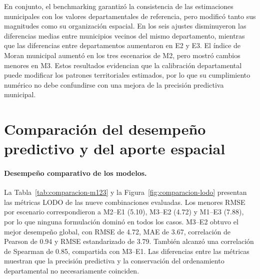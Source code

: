 En conjunto, el benchmarking garantizó la consistencia de las estimaciones municipales con los valores departamentales de referencia, pero modificó tanto sus magnitudes como su organización espacial. En los seis ajustes disminuyeron las diferencias medias entre municipios vecinos del mismo departamento, mientras que las diferencias entre departamentos aumentaron en E2 y E3. El índice de Moran municipal aumentó en los tres escenarios de M2, pero mostró cambios menores en M3. Estos resultados evidencian que la calibración departamental puede modificar los patrones territoriales estimados, por lo que su cumplimiento numérico no debe confundirse con una mejora de la precisión predictiva municipal.


\section{Comparación del desempeño predictivo y del aporte espacial}
\label{sec:res-comparacion}

\paragraph{Desempeño comparativo de los modelos.}

La Tabla~\ref{tab:comparacion-m123} y la Figura~\ref{fig:comparacion-lodo} presentan las métricas LODO de las nueve combinaciones evaluadas. Los menores RMSE por escenario correspondieron a M2--E1 (5.10), M3--E2 (4.72) y M1--E3 (7.88), por lo que ninguna formulación dominó en todos los casos. M3--E2 obtuvo el mejor desempeño global, con RMSE de 4.72, MAE de 3.67, correlación de Pearson de 0.94 y RMSE estandarizado de 3.79. También alcanzó una correlación de Spearman de 0.85, compartida con M3--E1. Las diferencias entre las métricas muestran que la precisión predictiva y la conservación del ordenamiento departamental no necesariamente coinciden.

